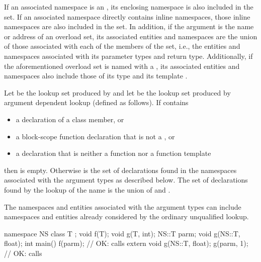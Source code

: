 If an associated namespace is an , its
enclosing namespace is also included in the set. If an associated namespace
directly contains inline namespaces, those inline namespaces are also included
in the set.
In addition, if the argument is the name or address of an overload set,
its associated entities
and namespaces are the union of those associated with each of the
members of the set, i.e., the entities and namespaces associated with its
parameter types and return type.
Additionally, if the aforementioned overload set is named with
a , its associated entities and namespaces also include
those of its type  and its template
.

\pnum
Let  be the lookup set produced by  and let  be the lookup set produced
by argument dependent lookup (defined as follows). If  contains
\begin{itemize}
\item a declaration of a class member, or
\item a block-scope function declaration that is not a , or
\item a declaration that is neither a function nor a function template
\end{itemize}
then  is empty. Otherwise  is the set of declarations
found in the namespaces associated with the argument types as described
below. The set of declarations found by the lookup of the name is the
union of  and .
\begin{note}
The namespaces and entities
associated with the argument types can include namespaces and entities
already considered by the ordinary unqualified lookup.
\end{note}
\begin{example}
\begin{codeblock}
namespace NS {
  class T { };
  void f(T);
  void g(T, int);
}
NS::T parm;
void g(NS::T, float);
int main() {
  f(parm);                      // OK: calls 
  extern void g(NS::T, float);
  g(parm, 1);                   // OK: calls 
}
\end{codeblock}
\end{example}

